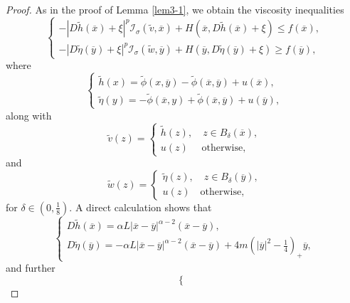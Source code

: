 \documentclass[10pt,a4paper]{amsart}
\begin{document}
\begin{proof}
As in the proof of Lemma \ref{lem3-1}, we obtain the viscosity inequalities
\begin{equation}
\label{3-2-4}
\begin{cases}
-|D\widetilde{h}(\overline{x})+\xi|^p\mathcal{I}_\sigma(\widetilde{v},\overline{x})+H(\overline{x},D\widetilde{h}(\overline{x})+\xi)\le f(\overline{x}),\\
-|D\widetilde{\eta}(\overline{y})+\xi|^p\mathcal{I}_\sigma(\widetilde{w},\overline{y})+H(\overline{y},D\widetilde{\eta}(\overline{y})+\xi)\ge f(\overline{y}),
\end{cases}
\end{equation}
where
\begin{equation*}
\begin{cases}
\widetilde{h}(x)=\widetilde{\phi}(x,\overline{y})-\widetilde{\phi}(\overline{x},\overline{y})+u(\overline{x}),\\
\widetilde{\eta}(y)=-\widetilde{\phi}(\overline{x},y)+\widetilde{\phi}(\overline{x},\overline{y})+u(\overline{y}),
\end{cases}
\end{equation*}
along with
\begin{equation*}
\widetilde{v}(z)=\begin{cases}\widetilde{h}(z),\quad z\in B_\delta(\overline{x}),\\
u(z)\quad\text{ otherwise},
\end{cases}
\end{equation*}
and
\begin{equation*}
\widetilde{w}(z)=\begin{cases}\widetilde{\eta}(z),\quad z\in B_\delta(\overline{y}),\\
u(z)\quad\text{otherwise},
\end{cases}
\end{equation*}
for $\delta\in(0,\frac18)$. A direct calculation shows that
\begin{equation*}
\begin{cases}
D\widetilde{h}(\overline{x})=\alpha L|\overline{x}-\overline{y}|^{\alpha-2}(\overline{x}-\overline{y}),\\
D\widetilde{\eta}(\overline{y})=-\alpha L|\overline{x}-\overline{y}|^{\alpha-2}(\overline{x}-\overline{y})+4m\left(|\overline{y}|^2-\frac{1}{4}\right)_+\overline{y},
\end{cases}
\end{equation*}
and further
\begin{equation*}
\begin{cases}

\end{cases}
\end{equation*}
\end{proof}
\end{document}
